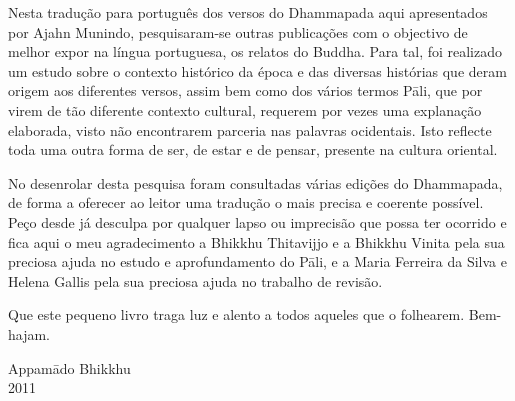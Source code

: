 
Nesta tradução para português dos versos do Dhammapada aqui apresentados por Ajahn Munindo, pesquisaram-se outras publicações com o objectivo de melhor expor na língua portuguesa, os relatos do Buddha. Para tal, foi realizado um estudo sobre o contexto histórico da época e das diversas histórias que deram origem aos diferentes versos, assim bem como dos vários termos Pāli, que por virem de tão diferente contexto cultural, requerem por vezes uma explanação elaborada, visto não encontrarem parceria nas palavras ocidentais. Isto reflecte toda uma outra forma de ser, de estar e de pensar, presente na cultura oriental. 

No desenrolar desta pesquisa foram consultadas várias edições do Dhammapada, de forma a oferecer ao leitor uma tradução o mais precisa e coerente possível. Peço desde já desculpa por qualquer lapso ou imprecisão que possa ter ocorrido e fica aqui o meu agradecimento a Bhikkhu Thitavijjo e a Bhikkhu Vinita pela sua preciosa ajuda no estudo e aprofundamento do Pāli, e a Maria Ferreira da Silva e Helena Gallis pela sua preciosa ajuda no trabalho de revisão. 

Que este pequeno livro traga luz e alento a todos aqueles que o folhearem. Bem-hajam.

\bigskip
{\par\raggedleft
Appamādo Bhikkhu\\
2011
\par}
